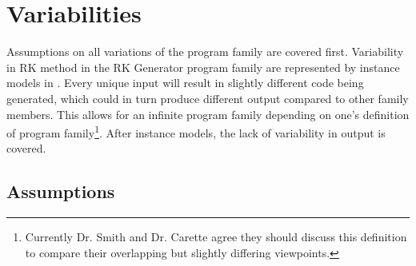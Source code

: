 \documentclass[12pt]{article}
\newcommand{\famname}{RK Generator} %
\begin{document}
\section{Variabilities}

Assumptions on all variations of the program family are covered first.
Variability in RK method in the \famname{} program family are represented by
instance models in . Every unique input will result in
slightly different code being generated, which could in turn produce different
output compared to other family members. This allows for an infinite program
family depending on one's definition of program family\footnote{Currently
  Dr. Smith and Dr. Carette agree they should discuss this definition to compare
  their overlapping but slightly differing viewpoints. }. After instance models, the lack of
variability in output is covered.

\subsection{Assumptions}\label{ssec:Assumptions}
\end{document}
